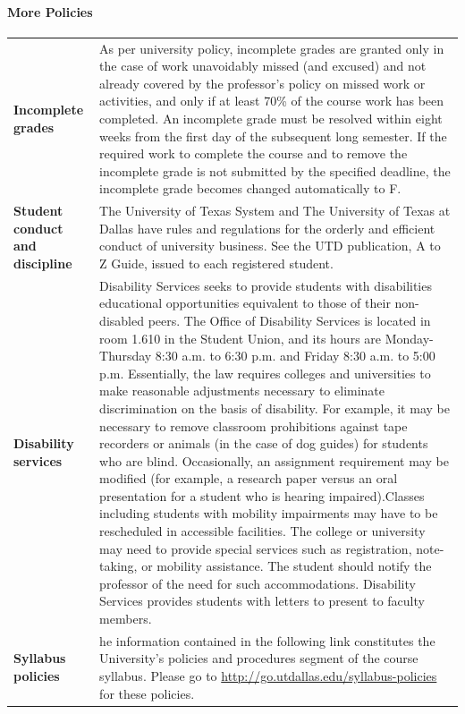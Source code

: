 \documentclass[10pt]{article}
\begin{document}
\paragraph{More  Policies}
\begin{center}
\begin{tabular}{|p{} p{}|}
\hline
\textbf{Incomplete grades} & As per university policy, incomplete grades are granted only in the case of work unavoidably missed (and excused) and not already covered by the professor's policy on missed work or activities, and only if at least 70\% of the course work has been completed. An incomplete grade must be resolved within eight weeks from the first day of the subsequent long semester. If the required work to complete the course and to remove the incomplete grade is not submitted by the specified deadline, the incomplete grade becomes changed automatically to F. \\
[.8ex]\textbf{Student conduct and discipline} & The University of Texas System and The University of Texas at Dallas have rules and regulations for the orderly and efficient conduct of university business.  See the UTD publication, A to Z Guide, issued to each registered student.\\
[.8ex]\textbf{Disability services} & Disability Services seeks to provide students with disabilities educational opportunities equivalent to those of their non-disabled peers. The Office of Disability Services is located in room 1.610 in the Student Union, and its hours are Monday-Thursday 8:30 a.m. to 6:30 p.m. and Friday 8:30 a.m. to 5:00 p.m. Essentially, the law requires colleges and universities to make reasonable adjustments necessary to eliminate discrimination on the basis of disability. For example, it may be necessary to remove classroom prohibitions against tape recorders or animals (in the case of dog guides) for students who are blind. Occasionally, an assignment requirement may be modified (for example, a research paper versus an oral presentation for a student who is hearing impaired).Classes including students with mobility impairments may have to be rescheduled in accessible facilities. The college or university may need to provide special services such as registration, note-taking, or mobility assistance. The student should notify the professor of the need for such accommodations. Disability Services provides students with letters to present to faculty members.\\
[.8ex] \textbf{Syllabus policies} & he information contained in the following link constitutes the University's policies and procedures segment of the course syllabus. Please go to \url{http://go.utdallas.edu/syllabus-policies} for these policies.\\

\end{tabular}
\end{center}
\end{document}
